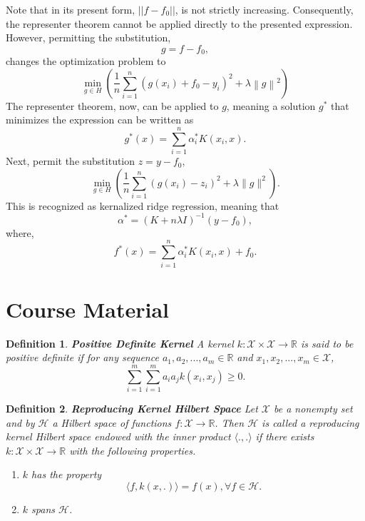 \documentclass[12pt]{article}
\newtheorem{defn}{Definition}
\begin{document}
Note that in its present form, $||f-f_0||$, is not strictly increasing. Consequently, the representer theorem cannot be applied directly to the presented expression. However, permitting the substitution, 
\begin{equation}
g = f - f_0,
\end{equation}
changes the optimization problem to
\begin{equation}
\min _{g \in H}\left(\frac{1}{n} \sum_{i=1}^{n}\left(g\left(x_{i}\right) + f_0-y_{i}\right)^{2}+\lambda\left\|g\right\|^{2}\right)
\end{equation}
The representer theorem, now, can be applied to $g$, meaning a solution $g^*$ that minimizes the expression can be written as
\begin{equation}
g^*(x) = \sum_{i=1}^{n} \alpha^*_i K(x_i, x).
\end{equation}
Next, permit the substitution $z=y-f_0$,
\begin{equation}
\min _{g \in H}\left(\frac{1}{n} \sum_{i=1}^{n}\left(g\left(x_{i}\right)-z_i\right)^{2}+\lambda\|g\|^{2}\right).
\end{equation}
This is recognized as kernalized ridge regression, meaning that
\begin{equation}
\alpha^* = (K+n\lambda I)^{-1} (y - f_0),
\end{equation}
where,
\begin{equation}
f^{*}(x)=\sum_{i=1}^{n} \alpha_{i}^{*} K\left(x_{i}, x\right) + f_0.
\end{equation}

\newpage
\section*{Course Material}
\begin{defn}{\textbf{Positive Definite Kernel}}
A kernel $k : \mathcal X \times \mathcal X \rightarrow \mathbb R$ is said to be positive definite if for any sequence $a_1,a_2,...,a_m \in \mathbb R$ and $x_1, x_2,...,x_m \in \mathcal X$,
\begin{equation}
\sum_{i=1}^{m} \sum_{i=1}^{m} a_i a_j k(x_i, x_j) \ge 0.
\end{equation}

\label{def:pd}
\end{defn}

\begin{defn}{\textbf{Reproducing Kernel Hilbert Space}}
Let $\mathcal X$ be a nonempty set and by $\mathcal H$ a Hilbert space of functions $f: \mathcal X \rightarrow \mathbb R$. Then $\mathcal H$ is called a reproducing kernel Hilbert space endowed with the inner product $\langle.,.\rangle$ if there exists $k: \mathcal X \times \mathcal X \rightarrow \mathbb R$ with the following properties.
\begin{enumerate}
\item $k$ has the property 
\begin{equation}
\langle f, k(x, .) \rangle = f(x), \forall f \in \mathcal H.
\end{equation}
\item $k$ spans $\mathcal H$.
\end{enumerate}
\end{defn}
\end{document}
